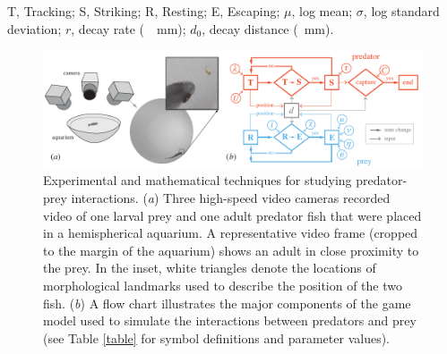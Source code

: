 \documentclass[]{rsos}%
\begin{document}
\begin{table}[!h]
T, Tracking; S, Striking; R, Resting; E, Escaping; $\mu$, log mean; $\sigma$, log standard deviation; $r$, decay rate (\SI{}{\per\mm}); $d_0$, decay distance (\SI{}{\mm}).
\end{table}%

\pagebreak

\linespread{1}\selectfont %


\begin{figure}[!h]
\centering
	\includegraphics[width=5.5in]{fig_setup}
\caption{Experimental and mathematical techniques for studying predator-prey interactions. 
(\textit{a}) Three high-speed video cameras recorded video of one larval prey and one adult predator fish that were placed in a hemispherical aquarium. 
A representative video frame (cropped to the margin of the aquarium) shows an adult in close proximity to the prey. 
In the inset, white triangles denote the locations of morphological landmarks used to describe the position of the two fish.
 (\textit{b}) A flow chart illustrates the major components of the game model used to simulate the interactions between predators and prey (see Table \ref{table} for symbol definitions and parameter values).}
\label{fig_setup}
\end{figure}

\pagebreak
\end{document}
